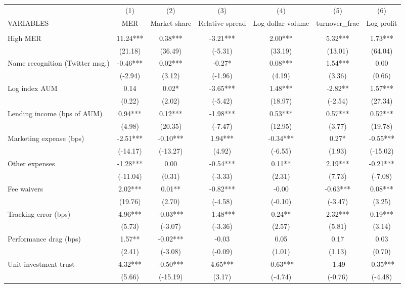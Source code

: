 \documentclass[]{article}
\begin{document}
\begin{tabular}{lcccccc} \hline
 & (1) & (2) & (3) & (4) & (5) & (6) \\
VARIABLES & MER & Market share & Relative spread & Log dollar volume & turnover\_frac & Log profit \\ \hline
 &  &  &  &  &  &  \\
High MER & 11.24*** & 0.38*** & -3.21*** & 2.00*** & 5.32*** & 1.73*** \\
 & (21.18) & (36.49) & (-5.31) & (33.19) & (13.01) & (64.04) \\
Name recognition (Twitter msg.) & -0.46*** & 0.02*** & -0.27* & 0.08*** & 1.54*** & 0.00 \\
 & (-2.94) & (3.12) & (-1.96) & (4.19) & (3.36) & (0.66) \\
Log index AUM & 0.14 & 0.02* & -3.65*** & 1.48*** & -2.82** & 1.57*** \\
 & (0.22) & (2.02) & (-5.42) & (18.97) & (-2.54) & (27.34) \\
Lending income (bps of AUM) & 0.94*** & 0.12*** & -1.98*** & 0.53*** & 0.57*** & 0.52*** \\
 & (4.98) & (20.35) & (-7.47) & (12.95) & (3.77) & (19.78) \\
Marketing expense (bps) & -2.51*** & -0.10*** & 1.94*** & -0.34*** & 0.27* & -0.55*** \\
 & (-14.17) & (-13.27) & (4.92) & (-6.55) & (1.93) & (-15.02) \\
Other expenses & -1.28*** & 0.00 & -0.54*** & 0.11** & 2.19*** & -0.21*** \\
 & (-11.04) & (0.31) & (-3.33) & (2.31) & (7.73) & (-7.08) \\
Fee waivers & 2.02*** & 0.01** & -0.82*** & -0.00 & -0.63*** & 0.08*** \\
 & (19.76) & (2.70) & (-4.58) & (-0.10) & (-3.47) & (3.25) \\
Tracking error (bps) & 4.96*** & -0.03*** & -1.48*** & 0.24** & 2.32*** & 0.19*** \\
 & (5.73) & (-3.07) & (-3.36) & (2.57) & (5.81) & (3.14) \\
Performance drag (bps) & 1.57** & -0.02*** & -0.03 & 0.05 & 0.17 & 0.03 \\
 & (2.41) & (-3.08) & (-0.09) & (1.01) & (1.13) & (0.70) \\
Unit investment trust & 4.32*** & -0.50*** & 4.65*** & -0.63*** & -1.49 & -0.35*** \\
 & (5.66) & (-15.19) & (3.17) & (-4.74) & (-0.76) & (-4.48) \\

\end{tabular}
\end{document}
